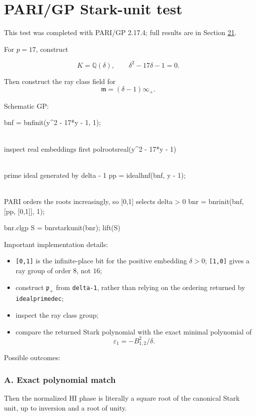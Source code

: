 \documentclass[11pt,reqno]{amsart}
\theoremstyle{plain}
\begin{document}
\section{PARI/GP Stark-unit test}\label{sec:12}

This test was completed with PARI/GP 2.17.4; full results are in Section \hyperref[sec:21]{21}.

For \(p=17\), construct

\[
K=\mathbb Q(\delta),
\qquad
\delta^2-17\delta-1=0.
\]

Then construct the ray class field for
\[
\mathfrak m=(\delta-1)\infty_+.
\]

Schematic GP:

\begin{code}
bnf = bnfinit(y^2 - 17*y - 1, 1);

\\ inspect real embeddings first
polrootsreal(y^2 - 17*y - 1)

\\ prime ideal generated by delta - 1
pp = idealhnf(bnf, y - 1);

\\ PARI orders the roots increasingly, so [0,1] selects delta > 0
bnr = bnrinit(bnf, [pp, [0,1]], 1);

bnr.clgp
S = bnrstarkunit(bnr);
lift(S)
\end{code}

Important implementation details:

\begin{itemize}
\item \texttt{[0,1]} is the infinite-place bit for the positive embedding \(\delta>0\); \texttt{[1,0]} gives a ray group of order \(8\), not \(16\);
\item construct \(\mathfrak p_+\) from \texttt{delta-1}, rather than relying on the ordering returned by \texttt{idealprimedec};
\item inspect the ray class group;
\item compare the returned Stark polynomial with the exact minimal polynomial of
\[
\varepsilon_1=-B_{1,2}^2/\delta.
\]
\end{itemize}

Possible outcomes:

\subsubsection*{A. Exact polynomial match}

Then the normalized HI phase is literally a square root of the canonical Stark unit, up to inversion and a root of unity.
\end{document}
